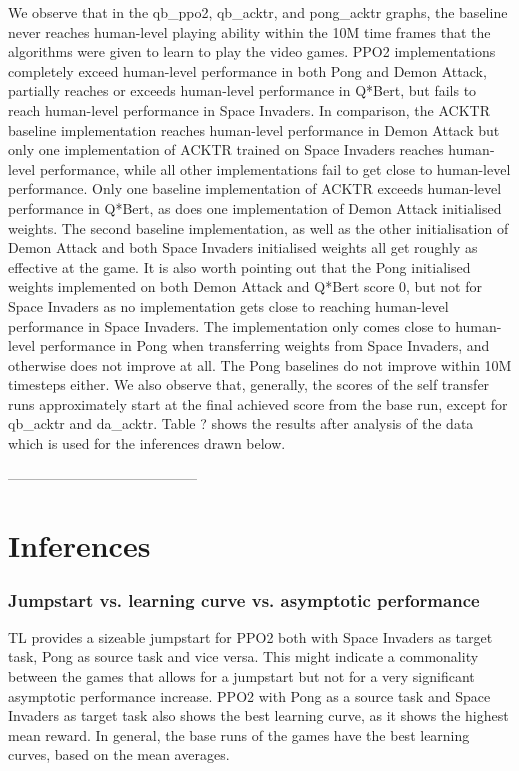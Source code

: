 We observe that in the qb\_ppo2, qb\_acktr, and pong\_acktr graphs, the baseline never reaches human-level playing ability within the 10M time frames that the algorithms were given to learn to play the video games. 
PPO2 implementations completely exceed human-level performance in both Pong and Demon Attack, partially reaches or exceeds human-level performance in Q*Bert, but fails to reach human-level performance in Space Invaders. 
In comparison, the ACKTR baseline implementation reaches human-level performance in Demon Attack but only one implementation of ACKTR trained on Space Invaders reaches human-level performance, while all other implementations fail to get close to human-level performance. Only one baseline implementation of ACKTR exceeds human-level performance in Q*Bert, as does one implementation of Demon Attack initialised weights. The second baseline implementation, as well as the other initialisation of Demon Attack and both Space Invaders initialised weights all get roughly as effective at the game. It is also worth pointing out that the Pong initialised weights implemented on both Demon Attack and Q*Bert score 0, but not for Space Invaders as no implementation gets close to reaching human-level performance in Space Invaders. The implementation only comes close to human-level performance in Pong when transferring weights from Space Invaders, and otherwise does not improve at all. The Pong baselines do not improve within 10M timesteps either.
We also observe that, generally, the scores of the self transfer runs approximately start at the final achieved score from the base run, except for qb\_acktr and da\_acktr.
Table ? shows the results after analysis of the data which is used for the inferences drawn below.

-----------------------------------------
\section{Inferences}
\subsubsection*{Jumpstart vs. learning curve vs. asymptotic performance}
TL provides a sizeable jumpstart for PPO2 both with Space Invaders as target task, Pong as source task and vice versa. This might indicate a commonality between the games that allows for a jumpstart but not for a very significant asymptotic performance increase. PPO2 with Pong as a source task and Space Invaders as target task also shows the best learning curve, as it shows the highest mean reward. In general, the base runs of the games have the best learning curves, based on the mean averages. 

